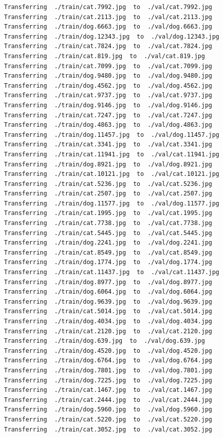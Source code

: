 \documentclass[]{book}
\theoremstyle{definition}
\theoremstyle{definition}
\theoremstyle{definition}
\theoremstyle{remark}
\begin{document}
\begin{verbatim}
Transferring  ./train/cat.7992.jpg  to  ./val/cat.7992.jpg
Transferring  ./train/cat.2113.jpg  to  ./val/cat.2113.jpg
Transferring  ./train/dog.6663.jpg  to  ./val/dog.6663.jpg
Transferring  ./train/dog.12343.jpg  to  ./val/dog.12343.jpg
Transferring  ./train/cat.7824.jpg  to  ./val/cat.7824.jpg
Transferring  ./train/cat.819.jpg  to  ./val/cat.819.jpg
Transferring  ./train/cat.7099.jpg  to  ./val/cat.7099.jpg
Transferring  ./train/dog.9480.jpg  to  ./val/dog.9480.jpg
Transferring  ./train/dog.4562.jpg  to  ./val/dog.4562.jpg
Transferring  ./train/cat.9737.jpg  to  ./val/cat.9737.jpg
Transferring  ./train/dog.9146.jpg  to  ./val/dog.9146.jpg
Transferring  ./train/cat.7247.jpg  to  ./val/cat.7247.jpg
Transferring  ./train/dog.4863.jpg  to  ./val/dog.4863.jpg
Transferring  ./train/dog.11457.jpg  to  ./val/dog.11457.jpg
Transferring  ./train/cat.3341.jpg  to  ./val/cat.3341.jpg
Transferring  ./train/cat.11941.jpg  to  ./val/cat.11941.jpg
Transferring  ./train/dog.8921.jpg  to  ./val/dog.8921.jpg
Transferring  ./train/cat.10121.jpg  to  ./val/cat.10121.jpg
Transferring  ./train/cat.5236.jpg  to  ./val/cat.5236.jpg
Transferring  ./train/cat.2507.jpg  to  ./val/cat.2507.jpg
Transferring  ./train/dog.11577.jpg  to  ./val/dog.11577.jpg
Transferring  ./train/cat.1995.jpg  to  ./val/cat.1995.jpg
Transferring  ./train/cat.7738.jpg  to  ./val/cat.7738.jpg
Transferring  ./train/cat.5445.jpg  to  ./val/cat.5445.jpg
Transferring  ./train/dog.2241.jpg  to  ./val/dog.2241.jpg
Transferring  ./train/cat.8549.jpg  to  ./val/cat.8549.jpg
Transferring  ./train/dog.1774.jpg  to  ./val/dog.1774.jpg
Transferring  ./train/cat.11437.jpg  to  ./val/cat.11437.jpg
Transferring  ./train/dog.8977.jpg  to  ./val/dog.8977.jpg
Transferring  ./train/dog.6064.jpg  to  ./val/dog.6064.jpg
Transferring  ./train/dog.9639.jpg  to  ./val/dog.9639.jpg
Transferring  ./train/cat.5014.jpg  to  ./val/cat.5014.jpg
Transferring  ./train/dog.4034.jpg  to  ./val/dog.4034.jpg
Transferring  ./train/cat.2120.jpg  to  ./val/cat.2120.jpg
Transferring  ./train/dog.639.jpg  to  ./val/dog.639.jpg
Transferring  ./train/dog.4520.jpg  to  ./val/dog.4520.jpg
Transferring  ./train/dog.6764.jpg  to  ./val/dog.6764.jpg
Transferring  ./train/dog.7801.jpg  to  ./val/dog.7801.jpg
Transferring  ./train/dog.7225.jpg  to  ./val/dog.7225.jpg
Transferring  ./train/cat.1467.jpg  to  ./val/cat.1467.jpg
Transferring  ./train/cat.2444.jpg  to  ./val/cat.2444.jpg
Transferring  ./train/dog.5960.jpg  to  ./val/dog.5960.jpg
Transferring  ./train/cat.5220.jpg  to  ./val/cat.5220.jpg
Transferring  ./train/cat.3052.jpg  to  ./val/cat.3052.jpg

\end{verbatim}
\end{document}
